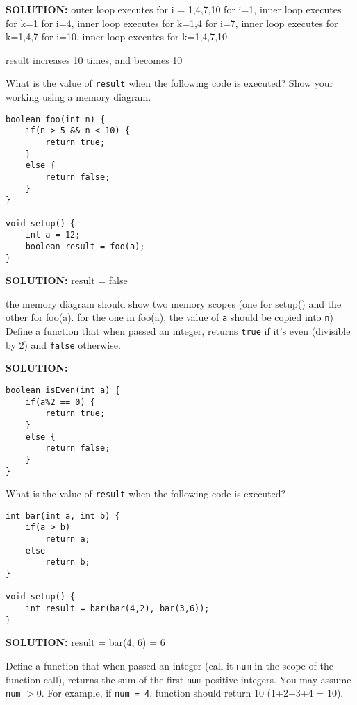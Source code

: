\documentclass[11pt]{exam}
\begin{document}
\begin{questions}
\ifprintanswers \vskip 1cm \textbf{SOLUTION:} \vskip 1cm
outer loop executes for i = 1,4,7,10
for i=1, inner loop executes for k=1
for i=4, inner loop executes for k=1,4
for i=7, inner loop executes for k=1,4,7
for i=10, inner loop executes for k=1,4,7,10

result increases 10 times, and becomes 10
\newpage \else
\newpage
\fi

\question
What is the value of \texttt{result} when the following code is executed? Show your working using a memory diagram.

\begin{lstlisting}
boolean foo(int n) {
	if(n > 5 && n < 10) {
		return true;
	}
	else {
		return false;
	}
}

void setup() {
	int a = 12;
	boolean result = foo(a);
}
\end{lstlisting}

\ifprintanswers \vskip 1cm \textbf{SOLUTION:} \vskip 1cm
result = false

the memory diagram should show two memory scopes (one for setup() and the other for foo(a). for the one in foo(a), the value of \texttt{a} should be copied into \texttt{n})
\newpage \else
	\vskip 4cm
\fi
\question
Define a function that when passed an integer, returns \texttt{true} if it's even (divisible by 2) and \texttt{false} otherwise.
 
\ifprintanswers \vskip 1cm \textbf{SOLUTION:} \vskip 1cm
\begin{lstlisting}
boolean isEven(int a) {
	if(a%2 == 0) {
		return true;
	}
	else {
		return false;
	}
}
\end{lstlisting}
\newpage \else
\newpage
\fi

\question
What is the value of \texttt{result} when the following code is executed? 

\begin{lstlisting}
int bar(int a, int b) {
	if(a > b)
		return a;
	else
		return b;
}

void setup() {
	int result = bar(bar(4,2), bar(3,6));
}
\end{lstlisting}

\ifprintanswers \vskip 1cm \textbf{SOLUTION:} \vskip 1cm
result = bar(4, 6) = 6
\newpage \else
	\vskip 3cm
\fi

\question
Define a function that when passed an integer (call it \texttt{num} in the scope of the function call), returns the sum of the first \texttt{num} positive integers. You may assume \texttt{num} $> 0$. For example, if \texttt{num = 4}, function should return 10 (1+2+3+4 = 10).


\end{questions}
\end{document}
